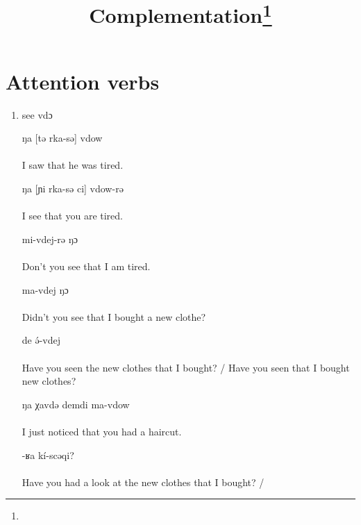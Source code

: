 \documentclass[oldfontcommands,oneside,a4paper,11pt]{article}
\newcommand{\ipa}[1]{{\phon #1}} %
\begin{document}
 

\title{Complementation\footnote{
} }
\maketitle
\linenumbers

\section{Attention verbs}

\begin{enumerate}
\item see \ipa{vdɔ}

\begin{exe}
\ex
\gll ŋa [tə rka-sə] vdow \\
\\
\glt I saw that he was tired.
\end{exe}

\begin{exe}
\ex
\gll ŋa [ɲi rka-sə ci] vdow-rə \\
\\
\glt I see that you are tired. %
\end{exe}

\begin{exe}
\ex
\gll [ŋa   rka-sə ci]  mi-vdej-rə ŋɔ \\
\\
\glt Don't you see that I am tired. %
\end{exe}

\begin{exe}
\ex
{}  ma-vdej  ŋɔ \\
\\
\glt Didn't you see that I bought a new clothe? %
\end{exe}

\begin{exe}
\ex
{} de ə́-vdej    \\
\\
\glt Have you seen the new clothes that I bought? / Have you seen that I bought new clothes?%
\end{exe}
\begin{exe}
\ex
\gll [ɲi ʁə nə-praˠ-sə] ŋa χavdə demdi   ma-vdow  \\
\\
\glt  I just noticed that you had a haircut.
\end{exe}
\begin{exe}
\ex
{}-ʁa kí-scəqi?    \\
\\
\glt Have you had a look at the new clothes that I bought? /  %
\end{exe}



\end{enumerate}
\end{document}
